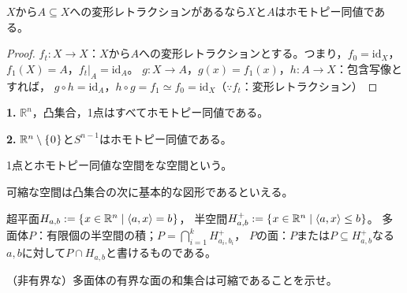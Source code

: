 \documentclass[uplatex]{jsarticle}
\renewcommand{\restriction}[2]{\left. #1 \right|_{#2}}
\begin{document}
\begin{hodai}
  $X$から$A \subseteq X$への変形レトラクションがあるなら$X$と$A$はホモトピー同値である。
\end{hodai}

\begin{proof}
  $f_{t} \colon X \longrightarrow X$：$X$から$A$への変形レトラクションとする。つまり，$f_{0} = \mathrm{id}_{X}$，$f_{1}(X) = A$，$\restriction{f_{t}}{A} = \mathrm{id}_{A}$。
  $g \colon X \longrightarrow A$，$g(x) = f_{1} (x)$，$h \colon A \longrightarrow X$：包含写像とすれば，
  $g \circ h = \mathrm{id}_{A}$，$h \circ g = f_{1} \simeq f_{0} = \mathrm{id}_{X}$（$\because f_{t}$：変形レトラクション）
\end{proof}

\begin{corr}
  {\bf 1.} $\mathbb{R}^{n}$，凸集合，1点はすべてホモトピー同値である。

  {\bf 2.} $\mathbb{R}^{n} \setminus \Set{\hspace{-1.8pt} 0 \hspace{-1.8pt}}$と$S^{n-1}$はホモトピー同値である。
\end{corr}

\begin{teigi}
  1点とホモトピー同値な空間をな空間という。
\end{teigi}

 可縮な空間は凸集合の次に基本的な図形であるといえる。

\sukima {} 超平面$H_{a,b} := \Set{\hspace{-1.8pt} x \in \mathbb{R}^{n} | \left\langle a, x \right\rangle = b \hspace{-1.8pt}}$，
半空間$H_{a,b}^{+} := \Set{\hspace{-1.8pt} x \in \mathbb{R}^{n} | \left\langle a, x \right\rangle \le b \hspace{-1.8pt}}$。
多面体$P$：有限個の半空間の積；${\displaystyle P = \bigcap_{i=1}^{k} H_{a_{i}, b_{i}}^{+}}$，
$P$の面：$P$または$P \subseteq H_{a,b}^{+}$なる$a,b$に対して$P \cap H_{a,b}$と書けるものである。

（非有界な）多面体の有界な面の和集合は可縮であることを示せ。
\end{document}
